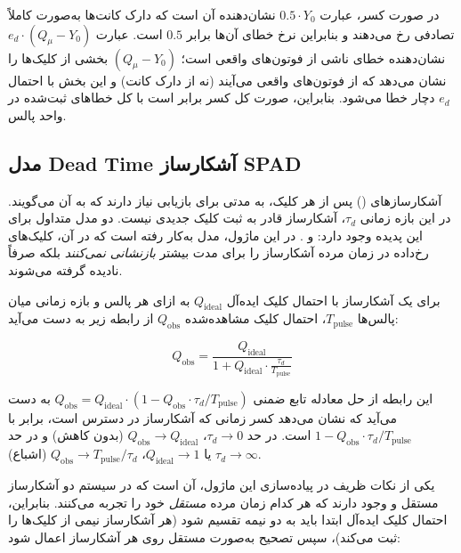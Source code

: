 در صورت کسر، عبارت $0.5 \cdot Y_0$ نشان‌دهنده آن است که دارک کانت‌ها به‌صورت کاملاً تصادفی رخ می‌دهند و بنابراین نرخ خطای آن‌ها برابر $0.5$ است. عبارت $e_d \cdot (Q_\mu - Y_0)$ نشان‌دهنده خطای ناشی از فوتون‌های واقعی است؛ $(Q_\mu - Y_0)$ بخشی از کلیک‌ها را نشان می‌دهد که از فوتون‌های واقعی می‌آیند (نه از دارک کانت) و این بخش با احتمال $e_d$ دچار خطا می‌شود. بنابراین، صورت کل کسر برابر است با کل خطاهای ثبت‌شده در واحد پالس.

\subsection{مدل Dead Time آشکارساز SPAD}

آشکارسازهای  () پس از هر کلیک، به مدتی برای بازیابی نیاز دارند که به آن  می‌گویند. در این بازه زمانی $\tau_d$، آشکارساز قادر به ثبت کلیک جدیدی نیست. دو مدل متداول برای این پدیده وجود دارد:  و . در این ماژول، مدل  به‌کار رفته است که در آن، کلیک‌های رخ‌داده در زمان مرده آشکارساز را برای مدت بیشتر \emph{بازنشانی نمی‌کنند} بلکه صرفاً نادیده گرفته می‌شوند.

برای یک آشکارساز  با احتمال کلیک ایده‌آل $Q_{\text{ideal}}$ به ازای هر پالس و بازه زمانی میان پالس‌ها $T_{\text{pulse}}$، احتمال کلیک مشاهده‌شده $Q_{\text{obs}}$ از رابطه زیر به دست می‌آید:

\begin{equation}
	Q_{\text{obs}} = \frac{Q_{\text{ideal}}}{1 + Q_{\text{ideal}} \cdot \frac{\tau_d}{T_{\text{pulse}}}}
\end{equation}

این رابطه از حل معادله تابع ضمنی $Q_{\text{obs}} = Q_{\text{ideal}} \cdot (1 - Q_{\text{obs}} \cdot \tau_d / T_{\text{pulse}})$ به دست می‌آید که نشان می‌دهد کسر زمانی که آشکارساز در دسترس است، برابر با $1 - Q_{\text{obs}} \cdot \tau_d / T_{\text{pulse}}$ است. در حد $\tau_d \to 0$، $Q_{\text{obs}} \to Q_{\text{ideal}}$ (بدون کاهش) و در حد $\tau_d \to \infty$ یا $Q_{\text{ideal}} \to 1$، $Q_{\text{obs}} \to T_{\text{pulse}} / \tau_d$ (اشباع).

یکی از نکات ظریف در پیاده‌سازی این ماژول، آن است که در سیستم  دو آشکارساز مستقل  و  وجود دارند که هر کدام زمان مرده \emph{مستقل} خود را تجربه می‌کنند. بنابراین، احتمال کلیک  ایده‌آل ابتدا باید به دو نیمه تقسیم شود (هر آشکارساز نیمی از کلیک‌ها را ثبت می‌کند)، سپس تصحیح  به‌صورت مستقل روی هر آشکارساز اعمال شود:

